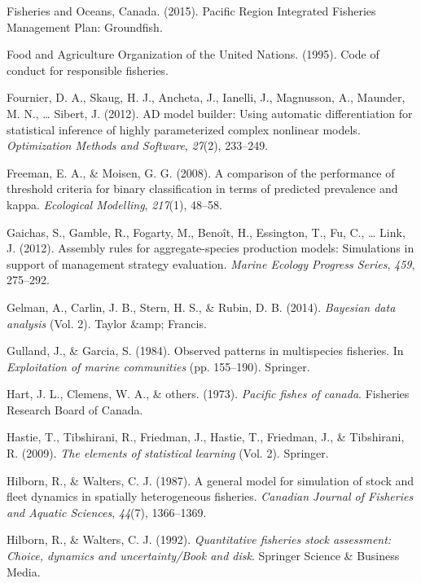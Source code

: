 \documentclass[12pt,]{scrartcl}
\begin{document}
\hypertarget{ref-PRIFMP2015}{}
Fisheries and Oceans, Canada. (2015). Pacific Region Integrated
Fisheries Management Plan: Groundfish.

\hypertarget{ref-FAO1995}{}
Food and Agriculture Organization of the United Nations. (1995). Code of
conduct for responsible fisheries.

\hypertarget{ref-fournier2012ad}{}
Fournier, D. A., Skaug, H. J., Ancheta, J., Ianelli, J., Magnusson, A.,
Maunder, M. N., \ldots{} Sibert, J. (2012). AD model builder: Using
automatic differentiation for statistical inference of highly
parameterized complex nonlinear models. \emph{Optimization Methods and
Software}, \emph{27}(2), 233--249.

\hypertarget{ref-freeman2008comparison}{}
Freeman, E. A., \& Moisen, G. G. (2008). A comparison of the performance
of threshold criteria for binary classification in terms of predicted
prevalence and kappa. \emph{Ecological Modelling}, \emph{217}(1),
48--58.

\hypertarget{ref-gaichas2012assembly}{}
Gaichas, S., Gamble, R., Fogarty, M., Benoît, H., Essington, T., Fu, C.,
\ldots{} Link, J. (2012). Assembly rules for aggregate-species
production models: Simulations in support of management strategy
evaluation. \emph{Marine Ecology Progress Series}, \emph{459}, 275--292.

\hypertarget{ref-gelman2014bayesian}{}
Gelman, A., Carlin, J. B., Stern, H. S., \& Rubin, D. B. (2014).
\emph{Bayesian data analysis} (Vol. 2). Taylor \&amp; Francis.

\hypertarget{ref-gulland1984observed}{}
Gulland, J., \& Garcia, S. (1984). Observed patterns in multispecies
fisheries. In \emph{Exploitation of marine communities} (pp. 155--190).
Springer.

\hypertarget{ref-hart1973pacific}{}
Hart, J. L., Clemens, W. A., \& others. (1973). \emph{Pacific fishes of
canada}. Fisheries Research Board of Canada.

\hypertarget{ref-hastie2009elements}{}
Hastie, T., Tibshirani, R., Friedman, J., Hastie, T., Friedman, J., \&
Tibshirani, R. (2009). \emph{The elements of statistical learning} (Vol.
2). Springer.

\hypertarget{ref-hilborn1987general}{}
Hilborn, R., \& Walters, C. J. (1987). A general model for simulation of
stock and fleet dynamics in spatially heterogeneous fisheries.
\emph{Canadian Journal of Fisheries and Aquatic Sciences}, \emph{44}(7),
1366--1369.

\hypertarget{ref-hilborn1992quantitative}{}
Hilborn, R., \& Walters, C. J. (1992). \emph{Quantitative fisheries
stock assessment: Choice, dynamics and uncertainty/Book and disk}.
Springer Science \& Business Media.
\end{document}

